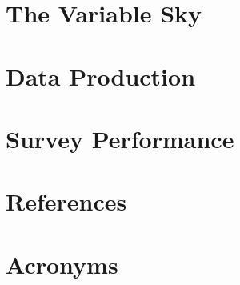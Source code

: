 \documentclass[SE,lsstdraft,authoryear,toc]{lsstdoc}
\begin{document}
\section{The Variable Sky}





\section{Data Production}



\section{Survey Performance} \label{sec:survey_performance}







\appendix
\section{References} \label{sec:bib}
\renewcommand{\refname}{} %


\section{Acronyms} \label{sec:acronyms}

\end{document}

